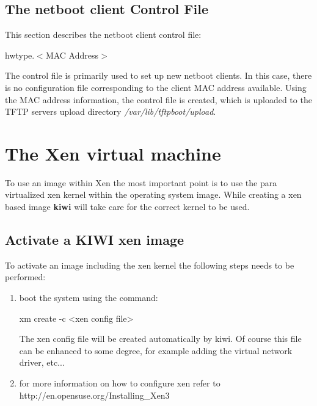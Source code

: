 
\subsection{The netboot client Control File}
\label{section:cntrlhw}
This section describes the netboot client control file:

\begin{Command}{8cm}
hwtype.$<$MAC Address$>$
\end{Command}

The control file is primarily used to set up new netboot clients. In this
case, there is no configuration file corresponding to the client
MAC address available. Using the MAC address information, the control file
is created, which is uploaded to the TFTP servers upload directory
\textit{/var/lib/tftpboot/upload}.

\section{The Xen virtual machine}
To use an image within Xen the most important point is to use
the para virtualized xen kernel within the operating system image.
While creating a xen based image \textbf{kiwi} will take care
for the correct kernel to be used.

\subsection{Activate a KIWI xen image}
To activate an image including the xen kernel the following steps
needs to be performed:

\begin{enumerate}
	\item boot the system using the command:

          \begin{Command}{9cm}
          xm create -c <xen config file>
          \end{Command}

          The xen config file will be created automatically by kiwi.
          Of course this file can be enhanced to some degree, for example
          adding the virtual network driver, etc...

    \item for more information on how to configure xen refer to\\
          http://en.opensuse.org/Installing\_Xen3
\end{enumerate}

